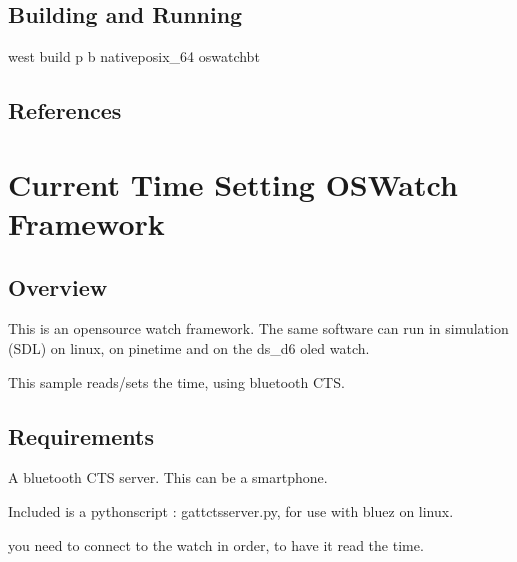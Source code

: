 \documentclass[letterpaper,10pt,english]{sphinxmanual}
\begin{document}
\subsection{Building and Running}
\label{\detokenize{samples/oswatch-btREADME:building-and-running}}
west build \sphinxhyphen{}p \sphinxhyphen{}b  native\sphinxhyphen{}posix\_64 oswatch\sphinxhyphen{}bt


\subsection{References}
\label{\detokenize{samples/oswatch-btREADME:references}}

\section{Current Time Setting  OSWatch Framework}
\label{\detokenize{samples/oswatch-ctsREADME:current-time-setting-oswatch-framework}}\label{\detokenize{samples/oswatch-ctsREADME:oswatch}}\label{\detokenize{samples/oswatch-ctsREADME::doc}}

\subsection{Overview}
\label{\detokenize{samples/oswatch-ctsREADME:overview}}
This is an opensource watch framework.
The same software can run in simulation (SDL) on linux, on pinetime and on the ds\_d6 oled watch.

This sample reads/sets the time, using bluetooth CTS.


\subsection{Requirements}
\label{\detokenize{samples/oswatch-ctsREADME:requirements}}
A bluetooth CTS server.
This can be a smartphone.

Included is a python\sphinxhyphen{}script : gatt\sphinxhyphen{}cts\sphinxhyphen{}server.py, for use with bluez on linux.

\begin{sphinxVerbatim}[commandchars=\\\{\}]
 
\end{sphinxVerbatim}

you need to connect to the watch in order, to have it read the time.

\begin{sphinxVerbatim}[commandchars=\\\{\}]
      
      
\end{sphinxVerbatim}
\end{document}
